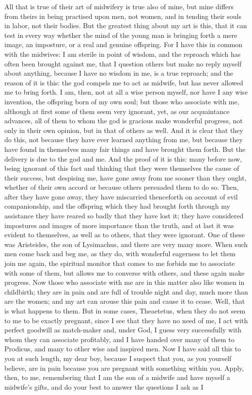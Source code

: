 \documentclass[letterpaper,12pt]{article}
\newcommand{\stephpag}[1]{\marginnote{\small\itshape\fontfamily{ppl}\selectfont #1}}
\begin{document}
\begin{drama}
All that is true of their art of midwifery is true also of mine, but mine differs from theirs in being practised upon men, not women, and in tending their souls in labor, not their bodies. But the greatest thing about my art is this, \stephpag{c} that it can test in every way whether the mind of the young man is bringing forth a mere image, an imposture, or a real and genuine offspring. For I have this in common with the midwives: I am sterile in point of wisdom, and the reproach which has often been brought against me, that I question others but make no reply myself about anything, because I have no wisdom in me, is a true reproach; and the reason of it is this: the god compels me to act as midwife, but has never allowed me to bring forth. I am, then, not at all a wise person myself, \stephpag{d} nor have I any wise invention, the offspring born of my own soul; but those who associate with me, although at first some of them seem very ignorant, yet, as our acquaintance advances, all of them to whom the god is gracious make wonderful progress, not only in their own opinion, but in that of others as well. And it is clear that they do this, not because they have ever learned anything from me, but because they have found in themselves many fair things and have brought them forth. But the delivery is due to the god and me. And the proof of it is this: many before now, \stephpag{e} being ignorant of this fact and thinking that they were themselves the cause of their success, but despising me, have gone away from me sooner than they ought, whether of their own accord or because others persuaded them to do so. Then, after they have gone away, they have miscarried thenceforth on account of evil companionship, and the offspring which they had brought forth through my assistance they have reared so badly that they have lost it; they have considered impostures and images of more importance than the truth, and at last it was evident to themselves, as well as to others, that they were ignorant. One of these was \stephpag{151 a} Aristeides, the son of Lysimachus, and there are very many more. When such men come back and beg me, as they do, with wonderful eagerness to let them join me again, the spiritual monitor that comes to me forbids me to associate with some of them, but allows me to converse with others, and these again make progress. Now those who associate with me are in this matter also like women in childbirth; they are in pain and are full of trouble night and day, much more than are the women; and my art can arouse this pain and cause it to cease. Well, that is what happens to them. \stephpag{b} But in some cases, Theaetetus, when they do not seem to me to be exactly pregnant, since I see that they have no need of me, I act with perfect goodwill as match-maker and, under God, I guess very successfully with whom they can associate profitably, and I have handed over many of them to Prodicus, and many to other wise and inspired men. Now I have said all this to you at such length, my dear boy, because I suspect that you, as you yourself believe, are in pain because you are pregnant with something within you. Apply, then, to me, remembering that I am the son of a midwife \stephpag{c} and have myself a midwife's gifts, and do your best to answer the questions I ask as I 
\end{drama}
\end{document}
